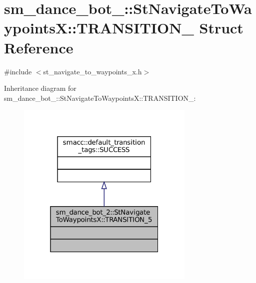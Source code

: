 \hypertarget{structsm__dance__bot__2_1_1StNavigateToWaypointsX_1_1TRANSITION__5}{}\section{sm\+\_\+dance\+\_\+bot\+\_\+:\+:St\+Navigate\+To\+WaypointsX\+:\+:T\+R\+A\+N\+S\+I\+T\+I\+O\+N\+\_ Struct Reference}
\label{structsm__dance__bot__2_1_1StNavigateToWaypointsX_1_1TRANSITION__5}


{\ttfamily \#include $<$st\+\_\+navigate\+\_\+to\+\_\+waypoints\+\_\+x.\+h$>$}



Inheritance diagram for sm\+\_\+dance\+\_\+bot\+\_\+:\+:St\+Navigate\+To\+WaypointsX\+:\+:T\+R\+A\+N\+S\+I\+T\+I\+O\+N\+\_\+:
\nopagebreak
\begin{figure}[H]
\begin{center}
\leavevmode
\includegraphics[width=241pt]{structsm__dance__bot__2_1_1StNavigateToWaypointsX_1_1TRANSITION__5__inherit__graph}
\end{center}
\end{figure}



